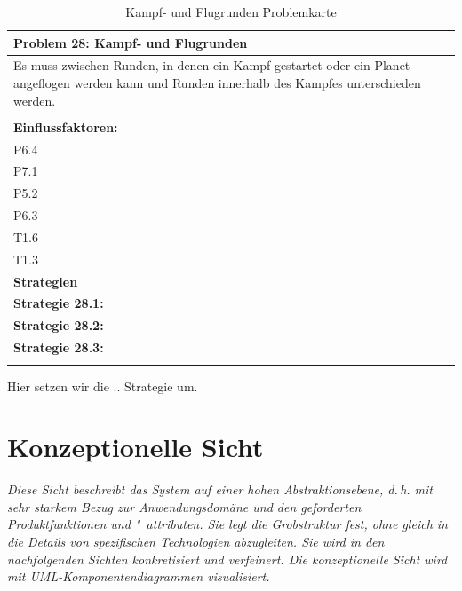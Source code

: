 \documentclass[fontsize=12pt,paper=a4,twoside]{scrartcl}
\begin{document}
\begin{table}[H]
    \centering
    \begin{tabular}{|p{15cm}|}
    \hline
          \textbf{Problem 28: Kampf- und Flugrunden}  \\ \hline
	Es muss zwischen Runden, in denen ein Kampf gestartet oder ein Planet angeflogen werden kann und Runden innerhalb des Kampfes unterschieden werden. \\
         \\ \hline
          \textbf{Einflussfaktoren: } \\
	P6.4 \\	
	P7.1 \\
	P5.2 \\
	P6.3 \\
	T1.6 \\
	T1.3 \\
          \hline
          \textbf{Strategien} \\ \hline
            {}          
           \label{strategie:28.1}     
          \textbf{Strategie 28.1:}  \\        
  {}          
           \label{strategie:28.2}              
          \textbf{Strategie 28.2:}  \\
	 {}          
           \label{strategie:28.3}     
          \textbf{Strategie 28.3: }  \\ 
	 \\ \hline
    \end{tabular}

    \caption{Kampf- und Flugrunden Problemkarte}
    \label{tab:ProblemKarte28}
\end{table}
Hier setzen wir die .. Strategie um. \\

\section{Konzeptionelle Sicht} \label{sec:konzeptionell}

{\itshape Diese Sicht beschreibt das System auf einer hohen Abstraktionsebene,
d.\,h. mit sehr starkem Bezug zur Anwendungsdomäne und den geforderten
Produktfunktionen und "~attributen. Sie legt die Grobstruktur fest, ohne gleich 
in die Details von spezifischen Technologien abzugleiten. Sie wird in den 
nachfolgenden Sichten konkretisiert und verfeinert. Die konzeptionelle Sicht 
wird mit {UML}-Komponentendiagrammen visualisiert.}
\end{document}
